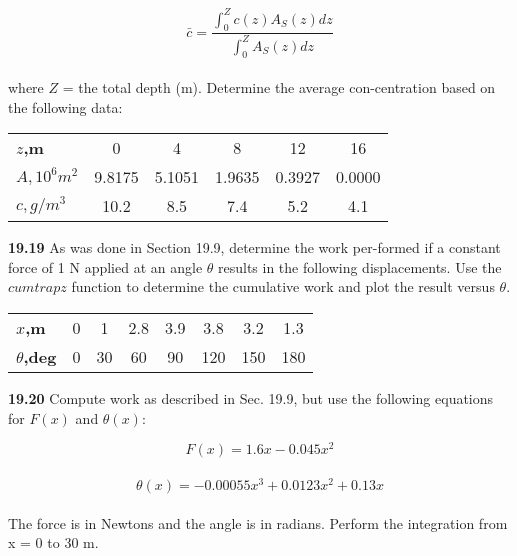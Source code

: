 \documentclass[../main.tex]{subfiles}
\begin{document}
\begin{multicols}{2}
	$$\bar{c} = \dfrac{\int^{Z}_{0}c(z)A_{S}(z)dz} {\int^{Z}_{0} A_{S}(z)dz}$$\\
where $Z$ = the total depth (m). Determine the average con-centration based on the following data:\\
\begin{tabular}{lccccc}
	\hline
	\scriptsize{\textbf{$z$,m}} & \scriptsize{0} & \scriptsize{4} & \scriptsize{8} & \scriptsize{12} & \scriptsize{16}\\
	\scriptsize{\textbf{$A,10^{6}m^{2}$}} & \scriptsize{9.8175} & \scriptsize{5.1051} & \scriptsize{1.9635} & \scriptsize{0.3927} & \scriptsize{0.0000}\\
	\scriptsize{\textbf{$c, g/m^{3}$}} & \scriptsize{10.2} & \scriptsize{8.5} & \scriptsize{7.4} & \scriptsize{5.2} & \scriptsize{4.1}\\ 	\hline
\end{tabular}

\textbf{19.19} As was done in Section 19.9, determine the work per-formed if a constant force of 1 N applied at an angle $\theta$ results
in the following displacements. Use the $cumtrapz$ function to
determine the cumulative work and plot the result versus $\theta$. \\
\begin{tabular}{lccccccc}
	\hline
	\scriptsize{\textbf{$x$,m}} & \scriptsize{0} & \scriptsize{1} & \scriptsize{2.8} & \scriptsize{3.9} & \scriptsize{3.8} & \scriptsize{3.2} & \scriptsize{1.3}\\
	\scriptsize{\textbf{$\theta$,deg}} & \scriptsize{0} & \scriptsize{30} & \scriptsize{60} & \scriptsize{90} & \scriptsize{120} & \scriptsize{150} & \scriptsize{180}\\ \hline
\end{tabular}

\textbf{19.20} Compute work as described in Sec. 19.9, but use the
following equations for $F(x)$ and $\theta(x)$:

	$$F(x)=1.6x-0.045x^{2}$$\\
	$$\theta(x)=-0.00055x^{3} + 0.0123x^{2} + 0.13x$$\\
The force is in Newtons and the angle is in radians. Perform
the integration from x = 0 to 30 m.


\end{multicols}
\end{document}
